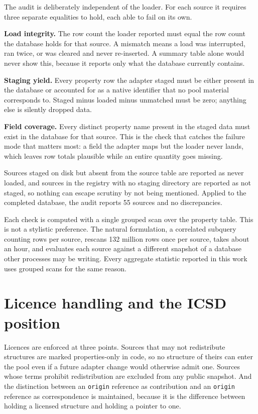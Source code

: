 The audit is deliberately independent of the loader. For each source it requires
three separate equalities to hold, each able to fail on its own.

\textbf{Load integrity.} The row count the loader reported must equal the row
count the database holds for that source. A mismatch means a load was interrupted,
ran twice, or was cleared and never re-inserted. A summary table alone would
never show this, because it reports only what the database currently contains.

\textbf{Staging yield.} Every property row the adapter staged must be either
present in the database or accounted for as a native identifier that no pool
material corresponds to. Staged minus loaded minus unmatched must be zero;
anything else is silently dropped data.

\textbf{Field coverage.} Every distinct property name present in the staged data
must exist in the database for that source. This is the check that catches the
failure mode that matters most: a field the adapter maps but the loader never
lands, which leaves row totals plausible while an entire quantity goes missing.

Sources staged on disk but absent from the source table are reported as never
loaded, and sources in the registry with no staging directory are reported as not
staged, so nothing can escape scrutiny by not being mentioned. Applied to the
completed database, the audit reports 55 sources and no discrepancies.

Each check is computed with a single grouped scan over the property table. This
is not a stylistic preference. The natural formulation, a correlated subquery
counting rows per source, rescans 132 million rows once per source, takes about
an hour, and evaluates each source against a different snapshot of a database
other processes may be writing. Every aggregate statistic reported in this work
uses grouped scans for the same reason.

\section{Licence handling and the ICSD position}\label{note:licence}

Licences are enforced at three points. Sources that may not redistribute
structures are marked properties-only in code, so no structure of theirs can
enter the pool even if a future adapter change would otherwise admit one. Sources
whose terms prohibit redistribution are excluded from any public snapshot. And
the distinction between an \texttt{origin} reference as contribution and an
\texttt{origin} reference as correspondence is maintained, because it is the
difference between holding a licensed structure and holding a pointer to one.

